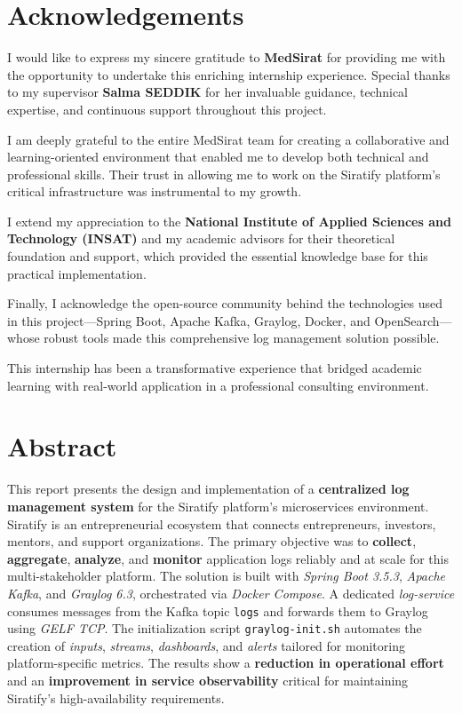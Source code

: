 \documentclass[12pt,a4paper]{report}
\begin{document}


\chapter*{Acknowledgements}

I would like to express my sincere gratitude to \textbf{MedSirat} for providing me with the opportunity to undertake this enriching internship experience. Special thanks to my supervisor \textbf{Salma SEDDIK} for her invaluable guidance, technical expertise, and continuous support throughout this project.

I am deeply grateful to the entire MedSirat team for creating a collaborative and learning-oriented environment that enabled me to develop both technical and professional skills. Their trust in allowing me to work on the Siratify platform's critical infrastructure was instrumental to my growth.

I extend my appreciation to the \textbf{National Institute of Applied Sciences and Technology (INSAT)} and my academic advisors for their theoretical foundation and support, which provided the essential knowledge base for this practical implementation.

Finally, I acknowledge the open-source community behind the technologies used in this project—Spring Boot, Apache Kafka, Graylog, Docker, and OpenSearch—whose robust tools made this comprehensive log management solution possible.

This internship has been a transformative experience that bridged academic learning with real-world application in a professional consulting environment.


\chapter*{Abstract}
This report presents the design and implementation of a \textbf{centralized log management system} for the Siratify platform's microservices environment. Siratify is an entrepreneurial ecosystem that connects entrepreneurs, investors, mentors, and support organizations. The primary objective was to \textbf{collect}, \textbf{aggregate}, \textbf{analyze}, and \textbf{monitor} application logs reliably and at scale for this multi-stakeholder platform. The solution is built with \textit{Spring Boot 3.5.3}, \textit{Apache Kafka}, and \textit{Graylog 6.3}, orchestrated via \textit{Docker Compose}. A dedicated \textit{log-service} consumes messages from the Kafka topic \texttt{logs} and forwards them to Graylog using \textit{GELF TCP}. The initialization script \texttt{graylog-init.sh} automates the creation of \textit{inputs}, \textit{streams}, \textit{dashboards}, and \textit{alerts} tailored for monitoring platform-specific metrics. The results show a \textbf{reduction in operational effort} and an \textbf{improvement in service observability} critical for maintaining Siratify's high-availability requirements.
\end{document}
